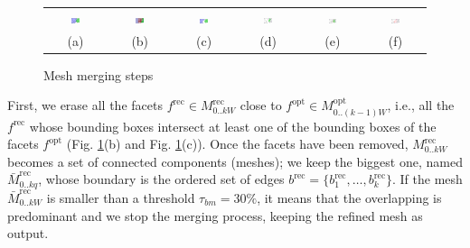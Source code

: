 \begin{figure}[t]
\centering
\setlength{\tabcolsep}{1px}
\begin{tabular}{cccccc}
\includegraphics[width=0.15\textwidth]{./img/ch-incr-dens/meshmerge01}&
\includegraphics[width=0.15\textwidth]{./img/ch-incr-dens/meshmerge03}&
\includegraphics[width=0.15\textwidth]{./img/ch-incr-dens/meshmerge04}&
\includegraphics[width=0.15\textwidth]{./img/ch-incr-dens/meshmerge07}&
\includegraphics[width=0.15\textwidth]{./img/ch-incr-dens/meshmerge09}&
\includegraphics[width=0.15\textwidth]{./img/ch-incr-dens/meshmerge11}\\
(a)&(b)&(c)&
(d)&(e)&(f)\\
\end{tabular}
\label{fig:mesh_merging}
\caption{Mesh merging steps}
\end{figure}
First, we erase all the facets  $f^{\text{rec}} \in \mathit{M}_{0..kW}^{\text{rec}}$ close to $f^{\text{opt}} \in \mathit{M}_{0..(k-1)W}^{\text{opt}}$, i.e., all the $f^{\text{rec}}$ whose bounding boxes intersect at least one of the bounding boxes of the facets $f^{\text{opt}}$ (Fig. \ref{fig:mesh_merging}(b) and Fig. \ref{fig:mesh_merging}(c)).
Once the facets have been removed, $\mathit{M}_{0..kW}^{\text{rec}}$ becomes a set of connected components (meshes); we keep the biggest one, named $\mathit{\bar{M}}_{0..kq}^{\text{rec}}$, whose boundary is the ordered set of edges $\mathit{b}^{\text{rec}} = \{b_1^{\text{rec}}, \dots,  b_k^{\text{rec}}\}$.
If the mesh $\mathit{\bar{M}}_{0..kW}^{\text{rec}}$ is smaller than a threshold $\tau_{bm}=30\%$, it means that the overlapping is predominant and we stop the merging process, keeping the refined mesh as output.

